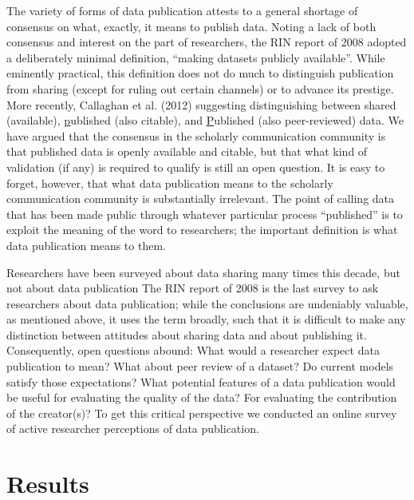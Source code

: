 \documentclass[10pt]{article}
\begin{document}
The variety of forms of data publication attests to a general shortage of consensus on what, exactly, it means to publish data.
Noting a lack of both consensus and interest on the part of researchers, the RIN report of 2008 adopted a deliberately minimal definition, ``making datasets publicly available''\cite{swan_share_2008}.
While eminently practical, this definition does not do much to distinguish publication from sharing (except for ruling out certain channels) or to advance its prestige.
More recently, Callaghan et al. (2012) suggesting distinguishing between shared (available), \underline{p}ublished (also citable), and \underline{P}ublished (also peer-reviewed) data\cite{callaghan_making_2012}.
We have argued that the consensus in the scholarly communication community is that published data is openly available and citable, but that what kind of validation (if any) is required to qualify is still an open question\cite{kratz_data_2014}.
It is easy to forget, however, that what data publication means to the scholarly communication community is substantially irrelevant.
The point of calling data that has been made public through whatever particular process ``published'' is to exploit the meaning of the word to researchers; the important definition is what data publication means to them. 

Researchers have been surveyed about data sharing many times this decade, but not about data publication\cite{harley_assessing_2010, westra_data_2010, tenopir_data_2011, kim_institutional_2012, scaramozzino_study_2012, williams_gathering_2013, bobrow_establishing_2014, strasser_dataup:_2014}
The RIN report of 2008 is the last survey to ask researchers about data publication; while the conclusions are undeniably valuable, as mentioned above, it uses the term broadly, such that it is difficult to make any distinction between attitudes about sharing data and about publishing it\cite{swan_share_2008}.
Consequently, open questions abound:
What would a researcher expect data publication to mean?
What about peer review of a dataset?
Do current models satisfy those expectations?
What potential features of a data publication would be useful for evaluating the quality of the data?
For evaluating the contribution of the creator(s)?
To get this critical perspective we conducted an online survey of active researcher perceptions of data publication.


\section*{Results}
\end{document}
